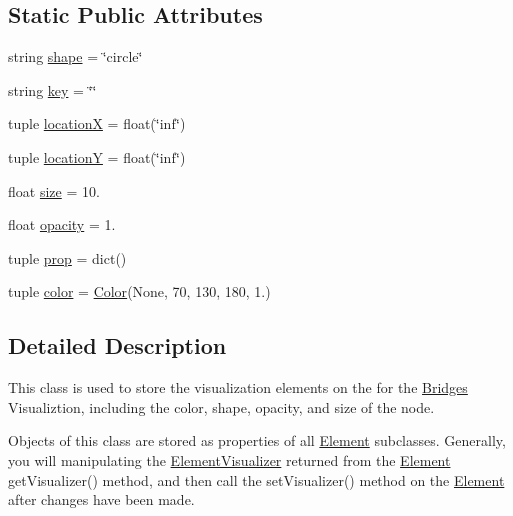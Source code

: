 \subsection*{Static Public Attributes}
\begin{DoxyCompactItemize}
\item 
string \hyperlink{class_element_visualizer_1_1_element_visualizer_ac65e55e81d3cd3aafa4ff3f236ce3298}{shape} = \char`\"{}circle\char`\"{}
\item 
string \hyperlink{class_element_visualizer_1_1_element_visualizer_a2fa41a34dcd4e8a0e46e83f923c1510d}{key} = \char`\"{}\char`\"{}
\item 
tuple \hyperlink{class_element_visualizer_1_1_element_visualizer_a7cd4d5b9464d74f07735583f56a9fb80}{location\+X} = float(\char`\"{}inf\char`\"{})
\item 
tuple \hyperlink{class_element_visualizer_1_1_element_visualizer_a4a317ba197b3f810b47a0d8c467c64a2}{location\+Y} = float(\char`\"{}inf\char`\"{})
\item 
float \hyperlink{class_element_visualizer_1_1_element_visualizer_ab4c0c8c7f0d19673eb6a75ddc06e14f9}{size} = 10.
\item 
float \hyperlink{class_element_visualizer_1_1_element_visualizer_a5350d49c7b8cdf5d93f5012db7229268}{opacity} = 1.
\item 
tuple \hyperlink{class_element_visualizer_1_1_element_visualizer_a78cdd9cc35942c1dcee2c8218a27cd43}{prop} = dict()
\item 
tuple \hyperlink{class_element_visualizer_1_1_element_visualizer_a6248707869334d18c03616da4a35a9b9}{color} = \hyperlink{class_color_1_1_color}{Color}(None, 70, 130, 180, 1.)
\end{DoxyCompactItemize}


\subsection{Detailed Description}
This class is used to store the visualization elements on the for the \hyperlink{namespace_bridges}{Bridges} Visualiztion, including the color, shape, opacity, and size of the node. 

Objects of this class are stored as properties of all \hyperlink{namespace_element}{Element} subclasses. Generally, you will manipulating the \hyperlink{class_element_visualizer_1_1_element_visualizer}{Element\+Visualizer} returned from the \hyperlink{namespace_element}{Element} get\+Visualizer() method, and then call the set\+Visualizer() method on the \hyperlink{namespace_element}{Element} after changes have been made. 

